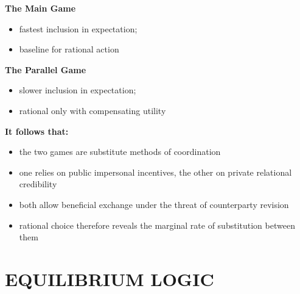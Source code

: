\documentclass[11pt]{article}
\begin{document}
\vspace{0.35cm}

{\large\bfseries
The Main Game
}

\begin{itemize}

\item fastest inclusion in expectation;

\item baseline for rational action

\end{itemize}

\vspace{0.35cm}

{\large\bfseries
The Parallel Game
}

\begin{itemize}

\item slower inclusion in expectation;

\item rational only with compensating utility

\end{itemize}

\vspace{0.35cm}


{\large\bfseries
It follows that:
}

\begin{itemize}
\item the two games are substitute methods of coordination
\item one relies on public impersonal incentives, the other on private relational credibility
\item both allow beneficial exchange under the threat of counterparty revision
\item rational choice therefore reveals the marginal rate of substitution between them
\end{itemize}


\newpage

















\section*{\LARGE EQUILIBRIUM LOGIC}
\end{document}
